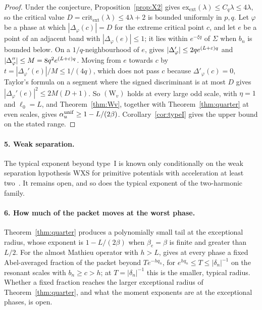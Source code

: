 \begin{proof}
Under the conjecture, Proposition~\ref{prop:X2} gives $\mathrm{ex}_{\mathrm{ext}}(\lambda)\le C_q\lambda\le4\lambda$, so the critical value $D=\mathrm{crit}_{\mathrm{ext}}(\lambda)\le4\lambda+2$ is bounded uniformly in $p,q$. Let $\varphi$ be a phase at which $|\Delta_\varphi(c)|=D$ for the extreme critical point $c$, and let $e$ be a point of an adjacent band with $|\Delta_\varphi(e)|\le1$; it lies within $e^{-\xi q}$ of $\Sigma$ when $b_n$ is bounded below. On a $1/q$-neighbourhood of $e$, \cite[Corollary~5.6]{DMuniv} gives $|\Delta_\varphi'|\le2qe^{(L+\varepsilon)q}$ and $|\Delta_\varphi''|\le M=8q^2e^{(L+\varepsilon)q}$. Moving from $e$ towards $c$ by $t=|\Delta_\varphi'(e)|/M\le1/(4q)$, which does not pass $c$ because $\Delta'_\varphi(c)=0$, Taylor's formula on a segment where the signed discriminant is at most $D$ gives $|\Delta_\varphi'(e)|^2\le2M(D+1)$. So $(\mathrm W_v)$ holds at every large odd scale, with $\eta=1$ and $\ell_0=L$, and Theorem~\ref{thm:Wv}, together with Theorem~\ref{thm:quarter} at even scales, gives $\alpha_u^{\mathrm{unif}}\ge1-L/(2\beta)$. Corollary~\ref{cor:typeI} gives the upper bound on the stated range.
\end{proof}



\paragraph{5. Weak separation.} The typical exponent beyond type~I is known only conditionally on the weak separation hypothesis WXS for primitive potentials with acceleration at least two~\cite[Definition~7.1 and Theorem~D]{DMuniv}. It remains open, and so does the typical exponent of the two-harmonic family.

\paragraph{6. How much of the packet moves at the worst phase.} Theorem~\ref{thm:quarter} produces a polynomially small tail at the exceptional radius, whose exponent is $1-L/(2\beta)$ when $\beta_e=\beta$ is finite and greater than $L/2$. For the almost Mathieu operator with $h>L$, \cite[Theorem~B]{DMamo} gives at every phase a fixed Abel-averaged fraction of the packet beyond $Te^{-hq_n}$, for $e^{hq_n}\le T\le|\delta_n|^{-1}$ on the resonant scales with $b_n\ge c>h$; at $T=|\delta_n|^{-1}$ this is the smaller, typical radius. Whether a fixed fraction reaches the larger exceptional radius of Theorem~\ref{thm:quarter}, and what the moment exponents are at the exceptional phases, is open.

